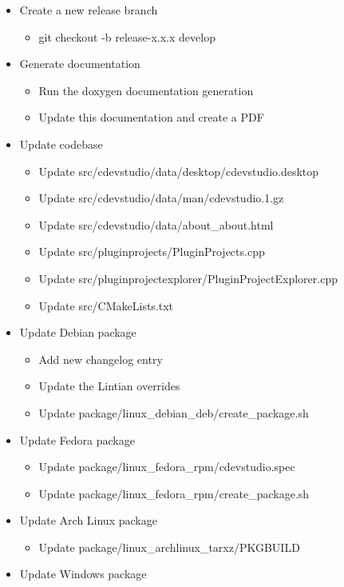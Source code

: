\documentclass{article}
\begin{document}
\begin{itemize}
	\item Create a new release branch
	\begin{itemize}
		\item git checkout -b release-x.x.x develop
	\end{itemize}
	\item Generate documentation
	\begin{itemize}
		\item Run the doxygen documentation generation
		\item Update this documentation and create a PDF
	\end{itemize}
	\item Update codebase
	\begin{itemize}
		\item Update src/cdevstudio/data/desktop/cdevstudio.desktop
		\item Update src/cdevstudio/data/man/cdevstudio.1.gz
		\item Update src/cdevstudio/data/about_about.html
		\item Update src/pluginprojects/PluginProjects.cpp
		\item Update src/pluginprojectexplorer/PluginProjectExplorer.cpp
		\item Update src/CMakeLists.txt
	\end{itemize}
	\item Update Debian package
	\begin{itemize}
		\item Add new changelog entry
		\item Update the Lintian overrides
		\item Update package/linux_debian_deb/create_package.sh
	\end{itemize}
	\item Update Fedora package
	\begin{itemize}
		\item Update package/linux_fedora_rpm/cdevstudio.spec
		\item Update package/linux_fedora_rpm/create_package.sh
	\end{itemize}
	\item Update Arch Linux package
	\begin{itemize}
		\item Update package/linux_archlinux_tarxz/PKGBUILD
	\end{itemize}
	\item Update Windows package
	\begin{itemize}

\end{itemize}
\end{itemize}
\end{document}
